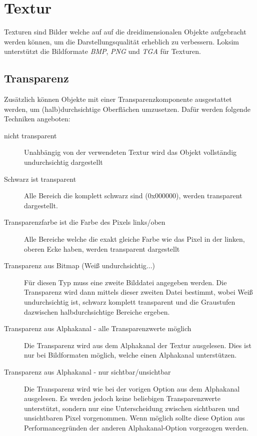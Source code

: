 \section{Textur}
\label{sec:editor-obj-textur}
Texturen sind Bilder welche auf auf die dreidimensionalen Objekte aufgebracht werden können, um die Darstellungsqualität erheblich zu verbessern. Loksim unterstützt die Bildformate \emph{BMP}, \emph{PNG} und \emph{TGA} für Texturen.

\subsection{Transparenz}
\label{sec:editor-obj-transparenz}
Zusätzlich können Objekte mit einer Transparenzkomponente ausgestattet werden, um (halb)durchsichtige Oberflächen umzusetzen. Dafür werden folgende Techniken angeboten:
\begin{description}
\item[nicht transparent] Unahbängig von der verwendeten Textur wird das Objekt vollständig undurchsichtig dargestellt
\item [Schwarz ist transparent] Alle Bereich die komplett schwarz sind (0x000000), werden transparent dargestellt.
\item [Transparenzfarbe ist die Farbe des Pixels links/oben] Alle Bereiche welche die exakt gleiche Farbe wie das Pixel in der linken, oberen Ecke haben, werden transparent dargestellt
\item [Transparenz aus Bitmap (Weiß undurchsichtig...)] Für diesen Typ muss eine zweite Bilddatei angegeben werden. Die Transparenz wird dann mittels dieser zweiten Datei bestimmt, wobei Weiß undurchsichtig ist, schwarz komplett transparent und die Graustufen dazwischen halbdurchsichtige Bereiche ergeben.
\item [Transparenz aus Alphakanal - alle Transparenzwerte möglich] Die Transparenz wird aus dem Alphakanal der Textur ausgelesen. Dies ist nur bei Bildformaten möglich, welche einen Alphakanal unterstützen. 
\item [Transparenz aus Alphakanal - nur sichtbar/unsichtbar] Die Transparenz wird wie bei der vorigen Option aus dem Alphakanal ausgelesen. Es werden jedoch keine beliebigen Transparenzwerte unterstützt, sondern nur eine Unterscheidung zwischen sichtbaren und unsichtbaren  Pixel vorgenommen. Wenn möglich sollte diese Option aus Performancegründen der anderen Alphakanal-Option vorgezogen werden. 
\end{description}

